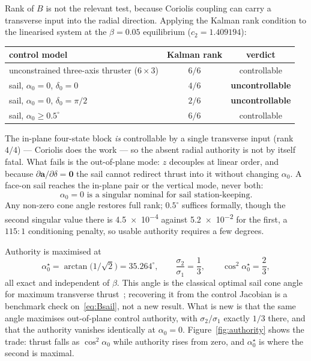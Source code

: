 \documentclass[11pt,a4paper]{article}
\begin{document}
Rank of $B$ is not the relevant test, because Coriolis coupling can carry a
transverse input into the radial direction. Applying the Kalman rank condition
to the linearised system at the $\beta=0.05$ equilibrium ($c_2=1.409194$):

\begin{center}
\begin{tabular}{lcc}
  \toprule
  control model & Kalman rank & verdict \\
  \midrule
  unconstrained three-axis thruster ($6\times3$) & $6/6$ & controllable \\
  sail, $\alpha_0=0$, $\delta_0=0$   & $4/6$ & \textbf{uncontrollable} \\
  sail, $\alpha_0=0$, $\delta_0=\pi/2$ & $2/6$ & \textbf{uncontrollable} \\
  sail, $\alpha_0\geq0.5^\circ$      & $6/6$ & controllable \\
  \bottomrule
\end{tabular}
\end{center}

The in-plane four-state block \emph{is} controllable by a single transverse
input (rank $4/4$) --- Coriolis does the work --- so the absent radial authority
is not by itself fatal. What fails is the out-of-plane mode: $z$ decouples at
linear order, and because $\partial\bm{a}/\partial\delta=\bm{0}$ the sail cannot
redirect thrust into it without changing $\alpha_0$. A face-on sail reaches the
in-plane pair or the vertical mode, never both:
\begin{equation}
  \alpha_0 = 0 \text{ is a singular nominal for sail station-keeping.}
\end{equation}
Any non-zero cone angle restores full rank; $0.5^\circ$ suffices formally,
though the second singular value there is \num{4.5e-4} against \num{5.2e-2} for
the first, a $115{:}1$ conditioning penalty, so usable authority requires a few
degrees.

Authority is maximised at
\begin{equation}
  \alpha_0^\star = \arctan\!\bigl(1/\sqrt2\bigr) = 35.264^\circ,
  \qquad
  \frac{\sigma_2}{\sigma_1} = \frac13,
  \qquad
  \cos^{2}\alpha_0^\star = \frac23 ,
  \label{eq:alphastar}
\end{equation}
all exact and independent of $\beta$. This angle is the classical optimal sail
cone angle for maximum transverse thrust~\cite[\S2.6]{mcinnes1999}; recovering
it from the control Jacobian is a benchmark check on~\eqref{eq:Bsail}, not a new
result. What is new is that the same angle maximises out-of-plane control
authority, with $\sigma_2/\sigma_1$ exactly $1/3$ there, and that the authority
vanishes identically at $\alpha_0=0$. Figure~\ref{fig:authority} shows the
trade: thrust falls as $\cos^{2}\alpha_0$ while authority rises from zero, and
$\alpha_0^\star$ is where the second is maximal.
\end{document}

